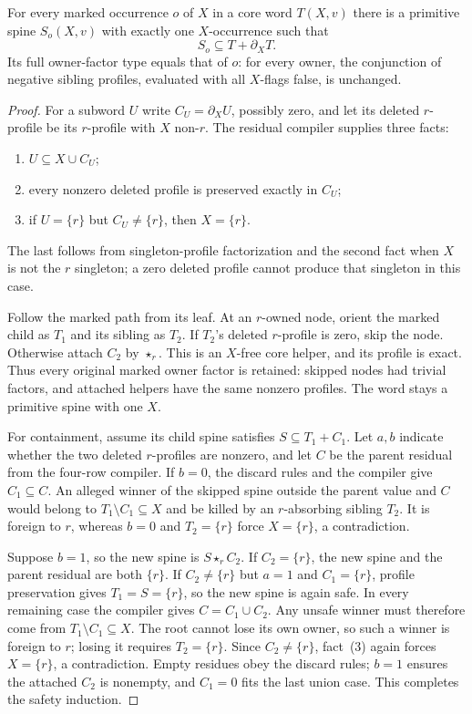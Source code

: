 \begin{lemma}
\label{core:lem:neutral-marked-linearization}
For every marked occurrence $o$ of $X$ in a core word $T(X,v)$ there is
a primitive spine $S_o(X,v)$ with exactly one $X$-occurrence such that
\[
 S_o\subseteq T+\partial_XT.
\]
Its full owner-factor type equals that of $o$: for every owner, the
conjunction of negative sibling profiles, evaluated with all $X$-flags
false, is unchanged.
\end{lemma}
\begin{proof}
For a subword $U$ write $C_U=\partial_XU$, possibly zero, and let its
deleted $r$-profile be its $r$-profile with $X$ non-$r$.
The residual compiler supplies three facts:
\begin{enumerate}
\item $U\subseteq X\cup C_U$;
\item every nonzero deleted profile is preserved exactly in $C_U$;
\item if $U=\{r\}$ but $C_U\ne\{r\}$, then $X=\{r\}$.
\end{enumerate}
The last follows from singleton-profile factorization and the second
fact when $X$ is not the $r$ singleton; a zero deleted profile cannot
produce that singleton in this case.

Follow the marked path from its leaf. At an $r$-owned node, orient the
marked child as $T_1$ and its sibling as $T_2$. If $T_2$'s deleted
$r$-profile is zero, skip the node. Otherwise attach $C_2$ by
$\star_r$. This is an $X$-free core helper, and its profile is exact.
Thus every original marked owner factor is retained: skipped nodes
had trivial factors, and attached helpers have the same nonzero profiles.
The word stays a primitive spine with one $X$.

For containment, assume its child spine satisfies $S\subseteq T_1+C_1$.
Let $a,b$ indicate whether the two deleted $r$-profiles are nonzero,
and let $C$ be the parent residual from the four-row compiler.
If $b=0$, the discard rules and the compiler give $C_1\subseteq C$.
An alleged winner of the skipped spine outside the parent value and $C$
would belong to $T_1\setminus C_1\subseteq X$ and be killed by an
$r$-absorbing sibling $T_2$. It is foreign to $r$, whereas $b=0$ and
$T_2=\{r\}$ force $X=\{r\}$, a contradiction.

Suppose $b=1$, so the new spine is $S\star_r C_2$.
If $C_2=\{r\}$, the new spine and the parent residual are both $\{r\}$.
If $C_2\ne\{r\}$ but $a=1$ and $C_1=\{r\}$, profile preservation
gives $T_1=S=\{r\}$, so the new spine is again safe.
In every remaining case the compiler gives $C=C_1\cup C_2$.
Any unsafe winner must therefore come from $T_1\setminus C_1\subseteq X$.
The root cannot lose its own owner, so such a winner is foreign to $r$;
losing it requires $T_2=\{r\}$. Since $C_2\ne\{r\}$, fact~(3)
again forces $X=\{r\}$, a contradiction.
Empty residues obey the discard rules; $b=1$ ensures the attached
$C_2$ is nonempty, and $C_1=0$ fits the last union case.
This completes the safety induction.
\end{proof}

